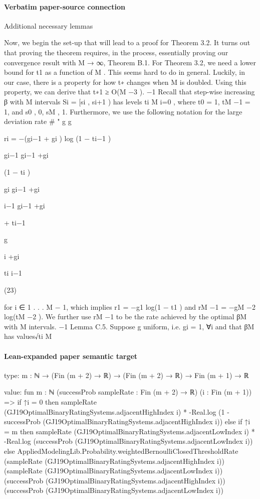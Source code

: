 \documentclass[10pt]{article}
\begin{document}
\paragraph{Verbatim paper-source connection}
\begin{ReviewVerbatim}
Additional necessary lemmas

Now, we begin the set-up that will lead to a proof for Theorem 3.2. It turns out that proving the
theorem requires, in the process, essentially proving our convergence result with M → ∞, Theorem B.1. For Theorem 3.2, we need a lower bound for t1 as a function of M . This seems hard
to do in general. Luckily, in our case, there is a property for how t∗ changes when M is doubled.
Using this property, we can derive that t∗1 ≥ O(M −3 ).
−1
Recall that step-wise increasing β with M intervals Si = [si , si+1 ) has levels {ti }M
i=0 , where
t0 = 1, tM −1 = 1, and s0 , 0, sM , 1.
Furthermore, we use the following notation for the large deviation rate
#
"
g
g

ri = −(gi−1 + gi ) log (1 − ti−1 )

gi−1
gi−1 +gi

(1 − ti )

gi
gi−1 +gi

i−1
gi−1 +gi

+ ti−1

g

i
+gi

ti i−1

(23)

for i ∈ {1 . . . M − 1}, which implies r1 = −g1 log(1 − t1 ) and rM −1 = −gM −2 log(tM −2 ).
We further use rM −1 to be the rate achieved by the optimal βM with M intervals.
−1
Lemma C.5. Suppose g uniform, i.e. gi = 1, ∀i and that βM has values√{ti }M
\end{ReviewVerbatim}



\paragraph{Lean-expanded paper semantic target}
\begin{ReviewVerbatim}
type:
{m : ℕ} → (Fin (m + 2) → ℝ) → (Fin (m + 2) → ℝ) → Fin (m + 1) → ℝ

value:
fun {m : ℕ} (successProb sampleRate : Fin (m + 2) → ℝ) (i : Fin (m + 1)) =>
  if ↑i = 0 then
    sampleRate (GJ19OptimalBinaryRatingSystems.adjacentHighIndex i) *
      -Real.log (1 - successProb (GJ19OptimalBinaryRatingSystems.adjacentHighIndex i))
  else
    if ↑i = m then
      sampleRate (GJ19OptimalBinaryRatingSystems.adjacentLowIndex i) *
        -Real.log (successProb (GJ19OptimalBinaryRatingSystems.adjacentLowIndex i))
    else
      AppliedModelingLib.Probability.weightedBernoulliClosedThresholdRate
        (sampleRate (GJ19OptimalBinaryRatingSystems.adjacentHighIndex i))
        (sampleRate (GJ19OptimalBinaryRatingSystems.adjacentLowIndex i))
        (successProb (GJ19OptimalBinaryRatingSystems.adjacentHighIndex i))
        (successProb (GJ19OptimalBinaryRatingSystems.adjacentLowIndex i))
\end{ReviewVerbatim}
\end{document}
